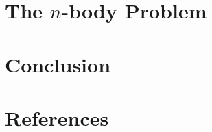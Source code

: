 \documentclass[letterpaper, 12pt]{amsart}
\theoremstyle{definition}  							%
\begin{document}
	\section{The $n$-body Problem}
	\label{sec:the_n-body_problem}
	\newpage

	\section{Conclusion}
	\label{sec:conclusion}

	\newpage
	\appendix

	\section{References}
	\label{sec:references}
\end{document}
